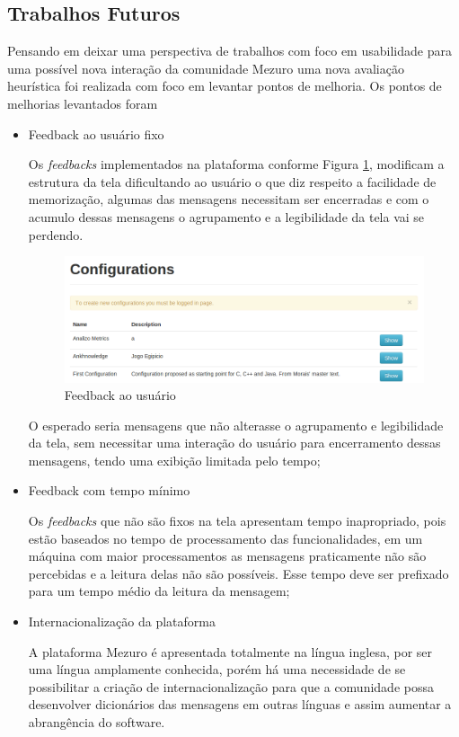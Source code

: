 \subsection{Trabalhos Futuros}
Pensando em deixar uma perspectiva de trabalhos com foco em usabilidade para uma possível nova interação da comunidade Mezuro uma nova avaliação heurística foi realizada com foco em levantar pontos de melhoria. Os pontos de melhorias levantados foram
\begin{itemize}
\item Feedback ao usuário fixo

Os \textit{feedbacks} implementados na plataforma conforme Figura \ref{feedback}, modificam a estrutura da tela dificultando ao usuário o que diz respeito a facilidade de memorização, algumas das mensagens necessitam ser encerradas e com o acumulo dessas mensagens o agrupamento e a legibilidade da tela vai se perdendo.

\graphicspath{{figuras/}}
\begin{figure}[h]
\centering
\includegraphics[width=1.0\textwidth]{FeedBack}
\caption{Feedback ao usuário}
\label{feedback}
\end{figure}

O esperado seria mensagens que não alterasse o agrupamento e legibilidade da tela, sem necessitar uma interação do usuário para encerramento dessas mensagens, tendo uma exibição limitada pelo tempo;

\item Feedback com tempo mínimo 

Os \textit{feedbacks} que não são fixos na tela apresentam tempo inapropriado, pois estão baseados no tempo de processamento das funcionalidades, em um máquina com maior processamentos as mensagens praticamente não são percebidas e a leitura delas não são possíveis. Esse tempo deve ser prefixado para um tempo médio da leitura da mensagem;

\item Internacionalização da plataforma

A plataforma Mezuro é apresentada totalmente na língua inglesa, por ser uma língua amplamente conhecida, porém há uma necessidade de se possibilitar a criação de internacionalização para que a comunidade possa desenvolver dicionários das mensagens em outras línguas e assim aumentar a abrangência do software.

\end{itemize}

